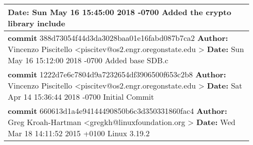 \documentclass[10pt,draftclsnofoot,onecolumn]{IEEEtran}
\begin{document}
\begin{center}
\begin{tabular}{ | p{14cm} | }
        {\bf Date:}   Sun May 16 15:45:00 2018 -0700\newline
        \newline  Added the crypto library include \\ \hline
        {\bf commit} 388d73054f44d3da3028baa01e16fabd087b7ca2 \newline
        {\bf Author:} Vincenzo Piscitello \textless piscitev@os2.engr.oregonstate.edu \textgreater \newline
        {\bf Date:}   Sun May 16 15:12:00 2018 -0700\newline
        \newline Added base SDB.c  \\ \hline
        {\bf commit} 1222d7e6c7804d9a7232654df3906500f653c2b8\newline
        {\bf Author:} Vincenzo Piscitello \textless piscitev@os2.engr.oregonstate.edu \textgreater \newline
        {\bf Date:}   Sat Apr 14 15:36:44 2018 -0700\newline
        \newline Initial Commit \\ \hline
        {\bf commit} 660613d1a4e94144490850b6c3d350331860fac4\newline
        {\bf Author:} Greg Kroah-Hartman \textless gregkh@linuxfoundation.org \textgreater \newline
        {\bf Date:}   Wed Mar 18 14:11:52 2015 +0100\newline
        \newline Linux 3.19.2  \\
        \hline
        \end{tabular}
    \end{center}
\end{document}
